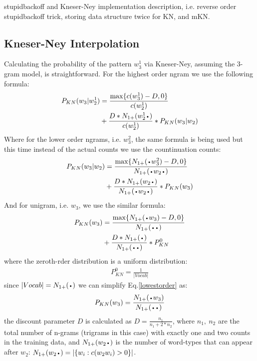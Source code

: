 \documentclass[11pt]{article}
\newcommand*{\LargerCdot}{\raisebox{-0.75ex}{\scalebox{2}{$\cdot$}}}
\begin{document}
stupidbackoff and Kneser-Ney implementation description, i.e. reverse order stupidbackoff trick, storing data structure twice for KN, and mKN.
\subsection{Kneser-Ney Interpolation}
Calculating the probability of the pattern $w^{1}_{3}$ via Kneser-Ney, assuming the 3-gram model, is straightforward. For the highest order ngram we use the following formula:
\begin{align}\label{highestorder}
 P_{KN}(w_3|w^{1}_{2}) &= \frac{\max\{c(w^{1}_{3}) - D,0\}}{c(w^{1}_{2})}\\\nonumber
 &+ \frac{D*N_{1+}(w^{1}_{2}\LargerCdot)}{c(w^{1}_{2})}*P_{KN}(w_3|w_2)
\end{align}
Where for the lower order ngrams, i.e. $w^{2}_{3}$, the same formula is being used but this time instead of the actual counts we use the countinuation counts:
\begin{align}\label{midorder}
P_{KN}(w_3|w_2) &= \frac{\max\{N_{1+}(\LargerCdot w^{2}_{3}) - D,0\}}{N_{1+}(\LargerCdot w_2 \LargerCdot)} \\\nonumber
&+ \frac{D*N_{1+}(w_2\LargerCdot)}{N_{1+}(\LargerCdot w_2 \LargerCdot)}*P_{KN}(w_3)
\end{align}
And for unigram, i.e. $w_3$, we use the similar formula:
\begin{align}\label{lowestorder}
P_{KN}(w_3) &= \frac{\max\{N_{1+}(\LargerCdot w_3) - D,0\}}{N_{1+}(\LargerCdot \LargerCdot)} \\\nonumber 
&+ \frac{D*N_{1+}(\LargerCdot)}{N_{1+}(\LargerCdot\LargerCdot)}*P_{KN}^{0}
\end{align}
where the zeroth-rder distribution is a uniform distribution:
\begin{align}\label{uniform}
P_{KN}^{0} = \frac{1}{|Vocab|}
\end{align}
since $|Vocab| = N_{1+}(\LargerCdot)$ we can simplify Eq.\ref{lowestorder} as:
\begin{align}\label{lowestordersimple}
P_{KN}(w_3) = \frac{N_{1+}(\LargerCdot w_3)}{N_{1+}(\LargerCdot\LargerCdot)}
\end{align}
the discount parameter $D$ is calculated as $D=\frac{n_1}{n_1 + 2*n_2}$, where $n_1,\ n_2$ are the total number of n-grams (trigrams in this case) with exactly one and two counts in the training data, and $N_{1+}(w_2\LargerCdot)$ is the number of word-types that can appear after \emph{$w_2$}: $N_{1+}(w_2\LargerCdot) = |\{w_i: c(w_2w_i)>0\}|$.
\end{document}
